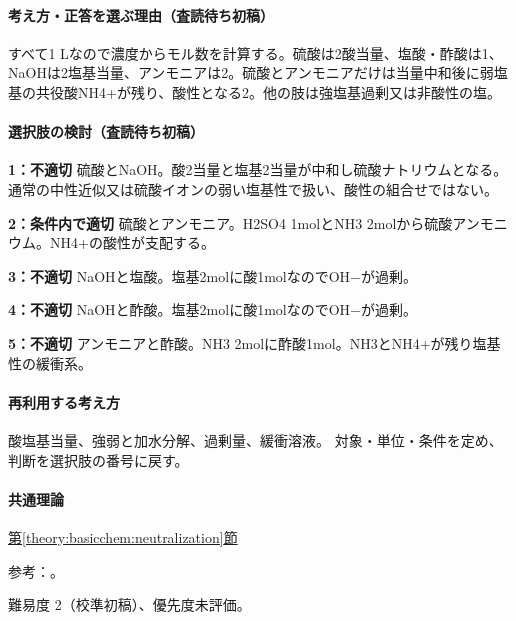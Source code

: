 \paragraph{考え方・正答を選ぶ理由（査読待ち初稿）} すべて1 Lなので濃度からモル数を計算する。硫酸は2酸当量、塩酸・酢酸は1、NaOHは2塩基当量、アンモニアは2。硫酸とアンモニアだけは当量中和後に弱塩基の共役酸NH4+が残り、酸性となる2。他の肢は強塩基過剰又は非酸性の塩。

\paragraph{選択肢の検討（査読待ち初稿）}\mbox{}\par

\noindent\textbf{1：不適切} 硫酸とNaOH。酸2当量と塩基2当量が中和し硫酸ナトリウムとなる。通常の中性近似又は硫酸イオンの弱い塩基性で扱い、酸性の組合せではない。\par

\noindent\textbf{2：条件内で適切} 硫酸とアンモニア。H2SO4 1molとNH3 2molから硫酸アンモニウム。NH4+の酸性が支配する。\par

\noindent\textbf{3：不適切} NaOHと塩酸。塩基2molに酸1molなのでOH−が過剰。\par

\noindent\textbf{4：不適切} NaOHと酢酸。塩基2molに酸1molなのでOH−が過剰。\par

\noindent\textbf{5：不適切} アンモニアと酢酸。NH3 2molに酢酸1mol。NH3とNH4+が残り塩基性の緩衝系。\par

\paragraph{再利用する考え方} 酸塩基当量、強弱と加水分解、過剰量、緩衝溶液。 対象・単位・条件を定め、判断を選択肢の番号に戻す。

\paragraph{共通理論} \hyperref[theory:basicchem:neutralization]{第\ref*{theory:basicchem:neutralization}節}

\par 参考：\cite{chem55_hydrolysis}。

\par 難易度 2（校準初稿）、優先度未評価。

